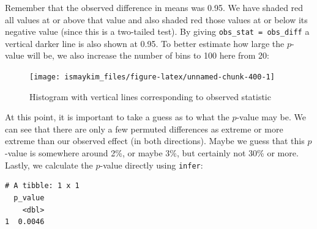 \documentclass[12pt,]{krantz}
\makeatletter
\newenvironment{Shaded}{\begin{snugshade}}{\end{snugshade}}
\newcommand{\KeywordTok}[1]{\textcolor[rgb]{0.27,0.27,0.27}{\textbf{#1}}}
\newcommand{\DataTypeTok}[1]{\textcolor[rgb]{0.27,0.27,0.27}{#1}}
\newcommand{\DecValTok}[1]{\textcolor[rgb]{0.06,0.06,0.06}{#1}}
\newcommand{\StringTok}[1]{\textcolor[rgb]{0.5,0.5,0.5}{#1}}
\newcommand{\OperatorTok}[1]{\textcolor[rgb]{0.43,0.43,0.43}{\textbf{#1}}}
\newcommand{\NormalTok}[1]{#1}
\newenvironment{kframe}{%
\medskip{}
\setlength{\fboxsep}{.8em}
 \def\at@end@of@kframe{}%
 \ifinner\ifhmode%
  \def\at@end@of@kframe{\end{minipage}}%
  \begin{minipage}{\columnwidth}%
 \fi\fi%
 \def\FrameCommand##1{\hskip\@totalleftmargin \hskip-\fboxsep
 \colorbox{shadecolor}{##1}\hskip-\fboxsep
     \hskip-\linewidth \hskip-\@totalleftmargin \hskip\columnwidth}%
 \MakeFramed {\advance\hsize-\width
   \@totalleftmargin\z@ \linewidth\hsize
   \@setminipage}}%
 {\par\unskip\endMakeFramed%
 \at@end@of@kframe}
\renewenvironment{Shaded}{\begin{kframe}}{\end{kframe}}
\theoremstyle{definition}
\theoremstyle{definition}
\theoremstyle{definition}
\theoremstyle{remark}
\makeatother
\begin{document}
Remember that the observed difference in means was 0.95. We have shaded
red all values at or above that value and also shaded red those values
at or below its negative value (since this is a two-tailed test). By
giving \texttt{obs\_stat\ =\ obs\_diff} a vertical darker line is also
shown at 0.95. To better estimate how large the \(p\)-value will be, we
also increase the number of bins to 100 here from 20:

\begin{Shaded}
\end{Shaded}

\begin{figure}

{\centering \texttt{[image: ismaykim\_files/figure-latex/unnamed-chunk-400-1]} 

}

\caption{Histogram with vertical lines corresponding to observed statistic}\label{fig:unnamed-chunk-400}
\end{figure}

At this point, it is important to take a guess as to what the
\(p\)-value may be. We can see that there are only a few permuted
differences as extreme or more extreme than our observed effect (in both
directions). Maybe we guess that this \(p\)-value is somewhere around
2\%, or maybe 3\%, but certainly not 30\% or more. Lastly, we calculate
the \(p\)-value directly using \texttt{infer}:

\begin{Shaded}
\end{Shaded}

\begin{verbatim}
# A tibble: 1 x 1
  p_value
    <dbl>
1  0.0046
\end{verbatim}
\end{document}
